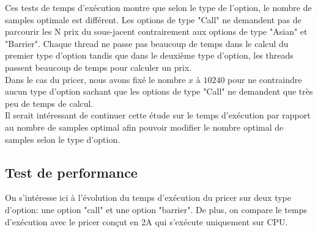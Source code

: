 \documentclass[french,12pt,a4paper]{article}
\begin{document}
Ces tests de temps d'exécution montre que selon le type de l'option, le nombre de samples optimale est différent. Les options de type "Call" ne demandent pas de parcourir les N prix du sous-jacent contrairement aux options de type "Asian" et "Barrier". Chaque thread ne passe pas beaucoup de temps dans le calcul du premier type d'option tandis que dans le deuxième type d'option, les threads passent beaucoup de temps pour calculer un prix. \\

Dans le cas du pricer, nous avons fixé le nombre $x$ à $10 240$ pour ne contraindre aucun type d'option sachant que les options de type "Call" ne demandent que très peu de temps de calcul.\\
Il serait intéressant de continuer cette étude sur le temps d'exécution par rapport au nombre de samples optimal afin pouvoir modifier le nombre optimal de samples selon le type d'option.\\

\newpage
\subsection{Test de performance}
 On s'intéresse ici à l'évolution du temps d'exécution du pricer sur deux type d'option: une option "call" et une option "barrier". De plus, on compare le temps d'exécution avec le pricer conçut en 2A qui s'exécute uniquement sur CPU.\\
 
\end{document}
